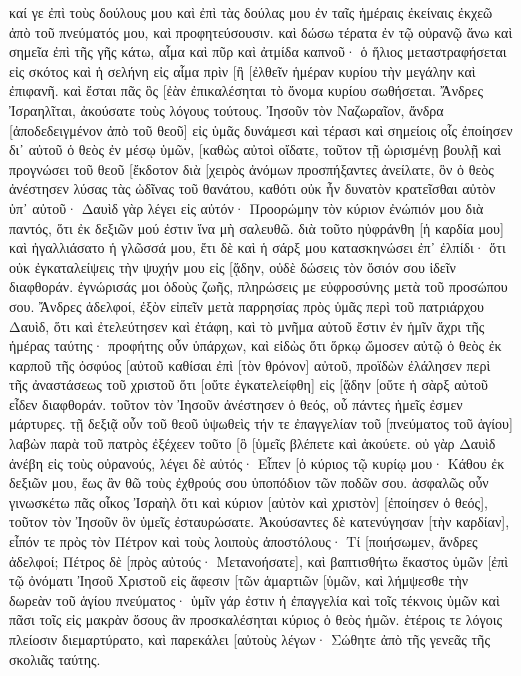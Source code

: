 καί γε ἐπὶ τοὺς δούλους μου καὶ ἐπὶ τὰς δούλας μου ἐν ταῖς ἡμέραις ἐκείναις ἐκχεῶ ἀπὸ τοῦ πνεύματός μου, καὶ προφητεύσουσιν. 
καὶ δώσω τέρατα ἐν τῷ οὐρανῷ ἄνω καὶ σημεῖα ἐπὶ τῆς γῆς κάτω, αἷμα καὶ πῦρ καὶ ἀτμίδα καπνοῦ· 
ὁ ἥλιος μεταστραφήσεται εἰς σκότος καὶ ἡ σελήνη εἰς αἷμα πρὶν [ἢ [ἐλθεῖν ἡμέραν κυρίου τὴν μεγάλην καὶ ἐπιφανῆ. 
καὶ ἔσται πᾶς ὃς [ἐὰν ἐπικαλέσηται τὸ ὄνομα κυρίου σωθήσεται. 
Ἄνδρες Ἰσραηλῖται, ἀκούσατε τοὺς λόγους τούτους. Ἰησοῦν τὸν Ναζωραῖον, ἄνδρα [ἀποδεδειγμένον ἀπὸ τοῦ θεοῦ] εἰς ὑμᾶς δυνάμεσι καὶ τέρασι καὶ σημείοις οἷς ἐποίησεν δι᾽ αὐτοῦ ὁ θεὸς ἐν μέσῳ ὑμῶν, [καθὼς αὐτοὶ οἴδατε, 
τοῦτον τῇ ὡρισμένῃ βουλῇ καὶ προγνώσει τοῦ θεοῦ [ἔκδοτον διὰ [χειρὸς ἀνόμων προσπήξαντες ἀνείλατε, 
ὃν ὁ θεὸς ἀνέστησεν λύσας τὰς ὠδῖνας τοῦ θανάτου, καθότι οὐκ ἦν δυνατὸν κρατεῖσθαι αὐτὸν ὑπ᾽ αὐτοῦ· 
Δαυὶδ γὰρ λέγει εἰς αὐτόν· Προορώμην τὸν κύριον ἐνώπιόν μου διὰ παντός, ὅτι ἐκ δεξιῶν μού ἐστιν ἵνα μὴ σαλευθῶ. 
διὰ τοῦτο ηὐφράνθη [ἡ καρδία μου] καὶ ἠγαλλιάσατο ἡ γλῶσσά μου, ἔτι δὲ καὶ ἡ σάρξ μου κατασκηνώσει ἐπ᾽ ἐλπίδι· 
ὅτι οὐκ ἐγκαταλείψεις τὴν ψυχήν μου εἰς [ᾅδην, οὐδὲ δώσεις τὸν ὅσιόν σου ἰδεῖν διαφθοράν. 
ἐγνώρισάς μοι ὁδοὺς ζωῆς, πληρώσεις με εὐφροσύνης μετὰ τοῦ προσώπου σου. 
Ἄνδρες ἀδελφοί, ἐξὸν εἰπεῖν μετὰ παρρησίας πρὸς ὑμᾶς περὶ τοῦ πατριάρχου Δαυὶδ, ὅτι καὶ ἐτελεύτησεν καὶ ἐτάφη, καὶ τὸ μνῆμα αὐτοῦ ἔστιν ἐν ἡμῖν ἄχρι τῆς ἡμέρας ταύτης· 
προφήτης οὖν ὑπάρχων, καὶ εἰδὼς ὅτι ὅρκῳ ὤμοσεν αὐτῷ ὁ θεὸς ἐκ καρποῦ τῆς ὀσφύος [αὐτοῦ καθίσαι ἐπὶ [τὸν θρόνον] αὐτοῦ, 
προϊδὼν ἐλάλησεν περὶ τῆς ἀναστάσεως τοῦ χριστοῦ ὅτι [οὔτε ἐγκατελείφθη] εἰς [ᾅδην [οὔτε ἡ σὰρξ αὐτοῦ εἶδεν διαφθοράν. 
τοῦτον τὸν Ἰησοῦν ἀνέστησεν ὁ θεός, οὗ πάντες ἡμεῖς ἐσμεν μάρτυρες. 
τῇ δεξιᾷ οὖν τοῦ θεοῦ ὑψωθεὶς τήν τε ἐπαγγελίαν τοῦ [πνεύματος τοῦ ἁγίου] λαβὼν παρὰ τοῦ πατρὸς ἐξέχεεν τοῦτο [ὃ [ὑμεῖς βλέπετε καὶ ἀκούετε. 
οὐ γὰρ Δαυὶδ ἀνέβη εἰς τοὺς οὐρανούς, λέγει δὲ αὐτός· Εἶπεν [ὁ κύριος τῷ κυρίῳ μου· Κάθου ἐκ δεξιῶν μου, 
ἕως ἂν θῶ τοὺς ἐχθρούς σου ὑποπόδιον τῶν ποδῶν σου. 
ἀσφαλῶς οὖν γινωσκέτω πᾶς οἶκος Ἰσραὴλ ὅτι καὶ κύριον [αὐτὸν καὶ χριστὸν] [ἐποίησεν ὁ θεός], τοῦτον τὸν Ἰησοῦν ὃν ὑμεῖς ἐσταυρώσατε. 
Ἀκούσαντες δὲ κατενύγησαν [τὴν καρδίαν], εἶπόν τε πρὸς τὸν Πέτρον καὶ τοὺς λοιποὺς ἀποστόλους· Τί [ποιήσωμεν, ἄνδρες ἀδελφοί; 
Πέτρος δὲ [πρὸς αὐτούς· Μετανοήσατε], καὶ βαπτισθήτω ἕκαστος ὑμῶν [ἐπὶ τῷ ὀνόματι Ἰησοῦ Χριστοῦ εἰς ἄφεσιν [τῶν ἁμαρτιῶν [ὑμῶν, καὶ λήμψεσθε τὴν δωρεὰν τοῦ ἁγίου πνεύματος· 
ὑμῖν γάρ ἐστιν ἡ ἐπαγγελία καὶ τοῖς τέκνοις ὑμῶν καὶ πᾶσι τοῖς εἰς μακρὰν ὅσους ἂν προσκαλέσηται κύριος ὁ θεὸς ἡμῶν. 
ἑτέροις τε λόγοις πλείοσιν διεμαρτύρατο, καὶ παρεκάλει [αὐτοὺς λέγων· Σώθητε ἀπὸ τῆς γενεᾶς τῆς σκολιᾶς ταύτης. 
